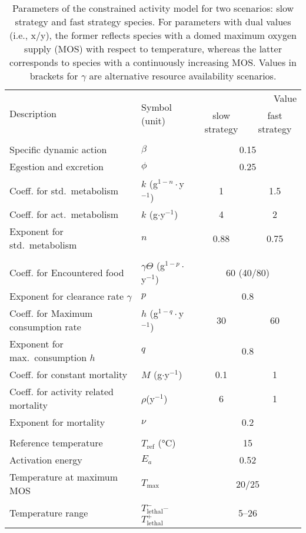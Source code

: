 \documentclass[11pt]{article}\usepackage[]{graphicx}\usepackage[]{color}
\begin{document}
\begin{table}
\caption{Parameters of the constrained activity model for two scenarios: slow strategy and fast strategy species. For parameters with dual values (i.e., x/y), the former reflects species with a domed maximum oxygen supply (MOS) with respect to temperature, whereas the latter corresponds to species with a continuously increasing MOS. Values in brackets for $\gamma$ are alternative resource availability scenarios.}
\label{tab:parameters}
\begin{tabular}{llcc}
 \multirow{2}{*}{Description} &  \multirow{2}{*}{Symbol (unit)} & \multicolumn{2}{r}{Value} \\
 \cmidrule{3-4}
 & & slow strategy  & fast strategy \\

\hline
\addlinespace
\multicolumn{4}{c}{\textbf{Biomass Metabolism}} \\
Specific dynamic action & $\beta$ & \multicolumn{2}{c}{0.15} \\
Egestion and excretion & $\phi$ & \multicolumn{2}{c}{0.25}  \\
Coeff. for std.~metabolism  & $k$ (g$^{1-n}\cdot$y$^{-1}$)  & 1 &  1.5 \\
Coeff. for act.~metabolism  & $k$ (g$ \cdot$y$^{-1}$)  & 4 &  2 \\
Exponent for std.~metabolism & $n$ & 0.88 & 0.75  \\

\addlinespace
\multicolumn{4}{c}{\textbf{Feeding ecology}}\\
Coeff. for Encountered food & $\gamma\Theta$ (g$^{1-p} \cdot$y$^{-1}$)& \multicolumn{2}{c}{60 (40/80)} \\
Exponent for clearance rate $\gamma$ & $p$ & \multicolumn{2}{c}{0.8}  \\
Coeff. for Maximum consumption rate & $h$ (g$^{1-q}\cdot$y$^{-1}$) & 30 & 60  \\
Exponent for max.~consumption $h$ & $q$ & \multicolumn{2}{c}{0.8} \\
Coeff. for constant mortality & $M$ (g$\cdot$y$^{-1}$) & 0.1  & 1  \\
Coeff. for activity related mortality & $\rho$(y$^{-1}$) & 6 & 1\\
Exponent for mortality & $\nu$ & \multicolumn{2}{c}{0.2} \\

\addlinespace
\multicolumn{4}{c}{\textbf{Temperature}}\\
Reference temperature  & $T_{\text{ref}}$ (°C)& \multicolumn{2}{c}{15} \\
Activation energy & $E_a$ & \multicolumn{2}{c}{0.52} \\
Temperature at maximum MOS & $T_{\text{max}}$ & \multicolumn{2}{c}{20/25}\\
Temperature range & $T^-_{\text{lethal}}$--$T^+_{\text{lethal}}$ & \multicolumn{2}{c}{5--26} \\


\end{tabular}
\end{table}
\end{document}
